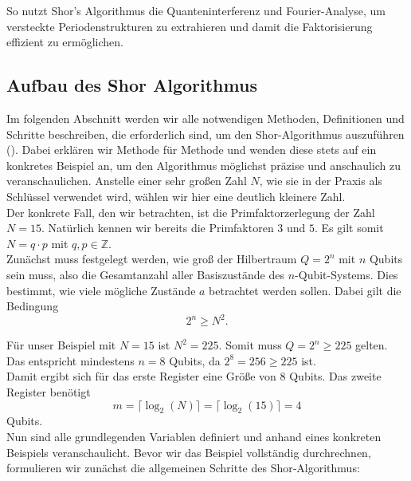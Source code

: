 So nutzt Shor's Algorithmus die Quanteninterferenz und Fourier-Analyse, um versteckte Periodenstrukturen zu extrahieren und damit die Faktorisierung effizient zu ermöglichen.

\subsection{Aufbau des Shor Algorithmus}

Im folgenden Abschnitt werden wir alle notwendigen Methoden, Definitionen und Schritte beschreiben, die erforderlich sind, um den Shor-Algorithmus auszuführen (\cite[15-17]{shor_polynomial-time_1994}). Dabei erklären wir Methode für Methode und wenden diese stets auf ein konkretes Beispiel an, um den Algorithmus möglichst präzise und anschaulich zu veranschaulichen. Anstelle einer sehr großen Zahl \( N \), wie sie in der Praxis als Schlüssel verwendet wird, wählen wir hier eine deutlich kleinere Zahl. \\

Der konkrete Fall, den wir betrachten, ist die Primfaktorzerlegung der Zahl \( N = 15 \). Natürlich kennen wir bereits die Primfaktoren \( 3 \) und \( 5 \). Es gilt somit \( N = q \cdot p \) mit \( q, p \in \mathbb{Z} \). \\

Zunächst muss festgelegt werden, wie groß der Hilbertraum \( Q = 2^n \) mit \( n \) Qubits sein muss, also die Gesamtanzahl aller Basiszustände des \( n \)-Qubit-Systems. Dies bestimmt, wie viele mögliche Zustände \( a \) betrachtet werden sollen. Dabei gilt die Bedingung
\[
2^n \geq N^2.
\]

Für unser Beispiel mit \( N = 15 \) ist \( N^2 = 225 \). Somit muss \( Q = 2^n \geq 225 \) gelten. Das entspricht mindestens \( n = 8 \) Qubits, da \( 2^8 = 256 \geq 225 \) ist. \\

Damit ergibt sich für das erste Register eine Größe von \( 8 \) Qubits. Das zweite Register benötigt
\[
m = \lceil \log_2(N) \rceil = \lceil \log_2(15) \rceil = 4
\]
Qubits.\\

Nun sind alle grundlegenden Variablen definiert und anhand eines konkreten Beispiels veranschaulicht. 
Bevor wir das Beispiel vollständig durchrechnen, formulieren wir zunächst die allgemeinen Schritte des Shor‑Algorithmus:

